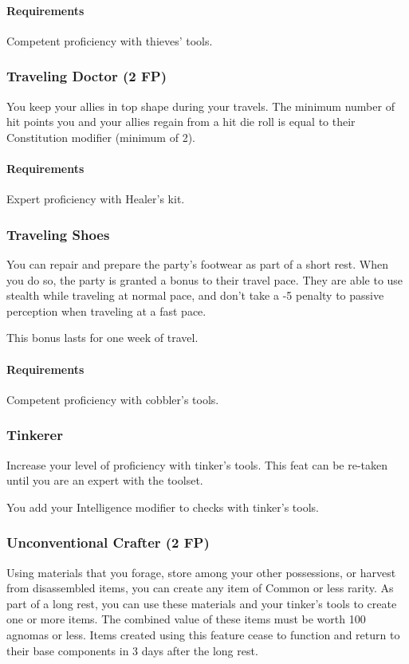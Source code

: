     \paragraph{Requirements} Competent proficiency with thieves' tools.
\subsubsection{Traveling Doctor (2 FP)} \label{feat::travelingdoctor}
    You keep your allies in top shape during your travels.
    The minimum number of hit points you and your allies regain from a hit die roll is equal to their Constitution modifier (minimum of 2).
    \paragraph{Requirements} Expert proficiency with Healer's kit.
\subsubsection{Traveling Shoes} \label{feat::travelingshoes}
    You can repair and prepare the party's footwear as part of a short rest.
    When you do so, the party is granted a bonus to their travel pace.
    They are able to use stealth while traveling at normal pace, and don't take a -5 penalty to passive perception when traveling at a fast pace.

    This bonus lasts for one week of travel.
    \paragraph{Requirements} Competent proficiency with cobbler's tools.
\subsubsection{Tinkerer} \label{feat::tinkerer}
    Increase your level of proficiency with tinker's tools.
    This feat can be re-taken until you are an expert with the toolset.

    You add your Intelligence modifier to checks with tinker's tools.
\subsubsection{Unconventional Crafter (2 FP)} \label{feat::unconventionalcrafter}
    Using materials that you forage, store among your other possessions, or harvest from disassembled items, you can create any item of Common or less rarity.
    As part of a long rest, you can use these materials and your tinker's tools to create one or more items.
    The combined value of these items must be worth 100 agnomas or less.
    Items created using this feature cease to function and return to their base components in 3 days after the long rest.
